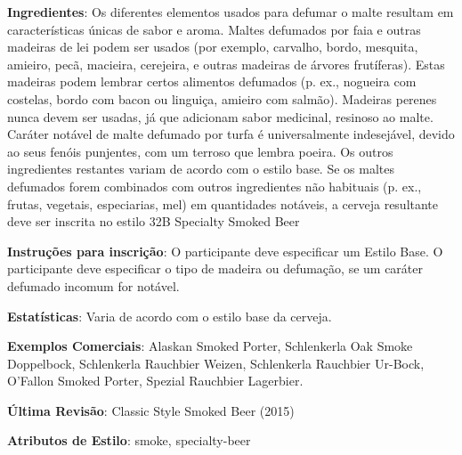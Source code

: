 \textbf{Ingredientes}: Os diferentes elementos usados para defumar o malte resultam em características únicas de sabor e aroma. Maltes defumados por faia e outras madeiras de lei podem ser usados (por exemplo, carvalho, bordo, mesquita, amieiro, pecã, macieira, cerejeira, e outras madeiras de árvores frutíferas). Estas madeiras podem lembrar certos alimentos defumados (p. ex., nogueira com costelas, bordo com bacon ou linguiça, amieiro com salmão). Madeiras perenes nunca devem ser usadas, já que adicionam sabor medicinal, resinoso ao malte. Caráter notável de malte defumado por turfa é universalmente indesejável, devido ao seus fenóis punjentes, com um terroso que lembra poeira. Os outros ingredientes restantes variam de acordo com o estilo base. Se os maltes defumados forem combinados com outros ingredientes não habituais (p. ex., frutas, vegetais, especiarias, mel) em quantidades notáveis, a cerveja resultante deve ser inscrita no estilo 32B Specialty Smoked Beer

\textbf{Instruções para inscrição}: O participante deve especificar um Estilo Base. O participante deve especificar o tipo de madeira ou defumação, se um caráter defumado incomum for notável.

\textbf{Estatísticas}: Varia de acordo com o estilo base da cerveja.

\textbf{Exemplos Comerciais}: Alaskan Smoked Porter, Schlenkerla Oak Smoke Doppelbock, Schlenkerla Rauchbier Weizen, Schlenkerla Rauchbier Ur-Bock, O’Fallon Smoked Porter, Spezial Rauchbier Lagerbier.

\textbf{Última Revisão}: Classic Style Smoked Beer (2015)

\textbf{Atributos de Estilo}: smoke, specialty-beer
